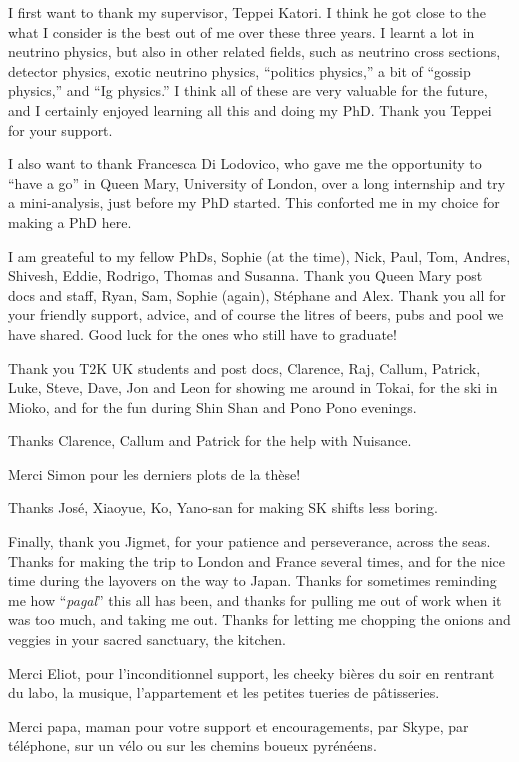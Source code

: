 

I first want to thank my supervisor, Teppei Katori. I think he got
close to the what I consider is the best out of me over these three
years. I learnt a lot in neutrino physics, but also in other related
fields, such as neutrino cross sections, detector physics, exotic
neutrino physics, ``politics physics,'' a bit of ``gossip physics,''
and ``Ig physics.'' I think all of these are very valuable for the
future, and I certainly enjoyed learning all this and doing my
PhD. Thank you Teppei for your support.

I also want to thank Francesca Di Lodovico, who gave me the
opportunity to ``have a go'' in Queen Mary, University of London, over
a long internship and try a mini-analysis, just before my PhD
started. This conforted me in my choice for making a PhD here.

I am greateful to my fellow PhDs, Sophie (at the time), Nick, Paul,
Tom, Andres, Shivesh, Eddie, Rodrigo, Thomas and Susanna. Thank you
Queen Mary post docs and staff, Ryan, Sam, Sophie (again), St\'ephane
and Alex. Thank you all for your friendly support, advice, and of
course the litres of beers, pubs and pool we have shared. Good luck
for the ones who still have to graduate!

Thank you T2K UK students and post docs, Clarence, Raj, Callum,
Patrick, Luke, Steve, Dave, Jon and Leon for showing me around in
Tokai, for the ski in Mioko, and for the fun during Shin Shan and Pono
Pono evenings.

Thanks Clarence, Callum and Patrick for the help with Nuisance.

Merci Simon pour les derniers plots de la th\`ese!

Thanks Jos\'e, Xiaoyue, Ko, Yano-san for making SK shifts less boring.

Finally, thank you Jigmet, for your patience and perseverance, across
the seas. Thanks for making the trip to London and France several
times, and for the nice time during the layovers on the way to
Japan. Thanks for sometimes reminding me how ``{\it pagal}'' this all
has been, and thanks for pulling me out of work when it was too much,
and taking me out. Thanks for letting me chopping the onions and
veggies in your sacred sanctuary, the kitchen.

Merci Eliot, pour l'inconditionnel support, les cheeky bi\`eres du
soir en rentrant du labo, la musique, l'appartement et les petites
tueries de p\^atisseries.

Merci papa, maman pour votre support et encouragements, par Skype, par
t\'el\'ephone, sur un v\'elo ou sur les chemins boueux
pyr\'en\'eens.

